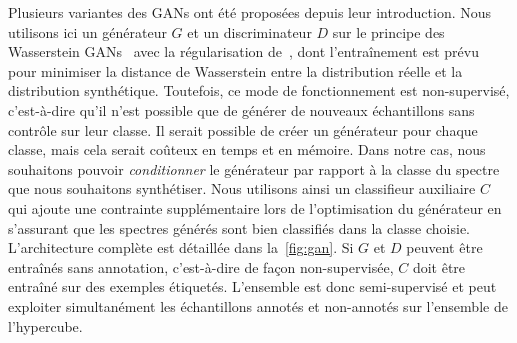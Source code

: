 Plusieurs variantes des \glspl{GAN} ont été proposées depuis leur introduction. Nous utilisons ici un générateur $G$ et un discriminateur $D$ sur le principe des Wasserstein \glspl{GAN}~\cite{arjovsky_wasserstein_2017} avec la régularisation de~\citet{gulrajani_improved_2017}, dont l'entraînement est prévu pour minimiser la distance de Wasserstein entre la distribution réelle et la distribution synthétique. Toutefois, ce mode de fonctionnement est non-supervisé, c'est-à-dire qu'il n'est possible que de générer de nouveaux échantillons sans contrôle sur leur classe. Il serait possible de créer un générateur pour chaque classe, mais cela serait coûteux en temps et en mémoire. Dans notre cas, nous souhaitons pouvoir \emph{conditionner} le générateur par rapport à la classe du spectre que nous souhaitons synthétiser. Nous utilisons ainsi un classifieur auxiliaire $C$~\cite{odena_conditional_2017} qui ajoute une contrainte supplémentaire lors de l'optimisation du générateur en s'assurant que les spectres générés sont bien classifiés dans la classe choisie.
L'architecture complète est détaillée dans la~\cref{fig:gan}. Si $G$ et $D$ peuvent être entraînés sans annotation, c'est-à-dire de façon non-supervisée, $C$ doit être entraîné sur des exemples étiquetés. L'ensemble est donc semi-supervisé et peut exploiter simultanément les échantillons annotés et non-annotés sur l'ensemble de l'hypercube.

